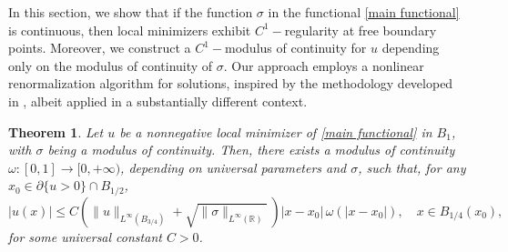 \documentclass[reqno,11pt]{amsart}
\newtheorem{theorem}{Theorem}[section]
\newcommand{\1}{\mathds{1}}  %
\numberwithin{equation}{section}
\begin{document}
In this section, we show that if the function $\sigma$ in the functional \eqref{main functional} is continuous, then local minimizers exhibit $C^1-$regularity at free boundary points. Moreover, we construct a $C^1-$modulus of continuity for $u$ depending only on the modulus of continuity of $\sigma$. Our approach employs a nonlinear renormalization algorithm for solutions, inspired by the methodology developed in \cite{APPT}, albeit applied in a substantially different context.

\begin{theorem}\label{C1 regularity at free boundary}
Let $u$ be a nonnegative local minimizer of \eqref{main functional} in $B_1$, with $\sigma$ being a modulus of continuity. Then, there exists a modulus of continuity $\omega \colon [0,1] \to [0,+\infty)$, depending on universal parameters and $\sigma$, such that, for any $x_0 \in \partial \{u>0\}\cap B_{1/2}$, 
$$
    |u(x)| \leq C\left(\|u\|_{L^\infty(B_{3/4})} + \sqrt{\|\sigma\|_{L^\infty(\mathbb{R})}} \, \right)|x-x_0|\,\omega(|x-x_0|), \quad x \in B_{1/4}(x_0),
$$
for some universal constant $C>0$.
\end{theorem}
\end{document}
